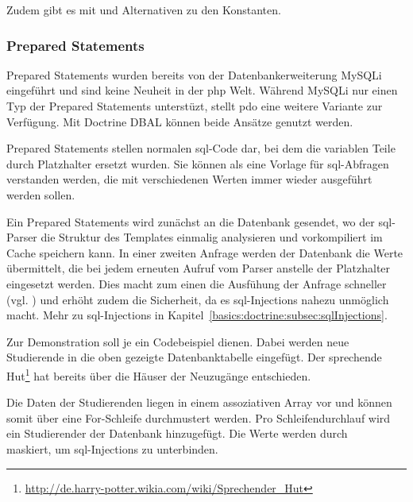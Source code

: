 Zudem gibt es mit  und  Alternativen zu den Konstanten.

\subsubsection{Prepared Statements}
\label{basics:doctrine:subsubsec:preparedStatements}
Prepared Statements wurden bereits von der Datenbankerweiterung MySQLi eingeführt und sind keine Neuheit in der \gls{php} Welt. Während MySQLi nur einen Typ der Prepared Statements unterstüzt, stellt \gls{pdo} eine weitere Variante zur Verfügung. Mit Doctrine DBAL können beide Ansätze genutzt werden.

Prepared Statements stellen normalen \gls{sql}-Code dar, bei dem die variablen Teile durch Platzhalter ersetzt wurden. Sie können als eine Vorlage für \gls{sql}-Abfragen verstanden werden, die mit verschiedenen Werten immer wieder ausgeführt werden sollen.

Ein Prepared Statements wird zunächst an die Datenbank gesendet, wo der \gls{sql}-Parser die Struktur des Templates einmalig analysieren und vorkompiliert im Cache speichern kann. In einer zweiten Anfrage werden der Datenbank die Werte übermittelt, die bei jedem erneuten Aufruf vom Parser anstelle der Platzhalter eingesetzt werden. Dies macht zum einen die Ausfühung der Anfrage schneller (vgl. \cite[S. 75]{book:popel2007pdo}) und erhöht zudem die Sicherheit, da es \gls{sql}-Injections nahezu unmöglich macht. Mehr zu \gls{sql}-Injections in Kapitel~\ref{basics:doctrine:subsec:sqlInjections}.

Zur Demonstration soll je ein Codebeispiel dienen. Dabei werden neue Studierende in die oben gezeigte Datenbanktabelle eingefügt. Der sprechende Hut\footnote{\url{http://de.harry-potter.wikia.com/wiki/Sprechender_Hut}} hat bereits über die Häuser der Neuzugänge entschieden.

Die Daten der Studierenden liegen in einem assoziativen Array vor und können somit über eine For-Schleife durchmustert werden. Pro Schleifendurchlauf wird ein Studierender der Datenbank hinzugefügt. Die Werte werden durch\\
 maskiert, um \gls{sql}-Injections zu unterbinden.

